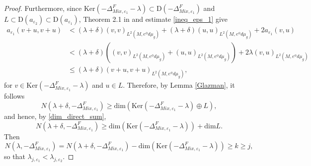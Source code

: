 \documentclass[12pt,a4paper]{amsart}
\numberwithin{equation}{section}
\theoremstyle{plain}
\theoremstyle{definition}
\begin{document}
\begin{proof}
	Furthermore, since $\mathrm{Ker}\left(-\Delta_{Mix,\varepsilon_1}^F - \lambda\right) \subset \mathrm{D}(-\Delta_{Mix,\varepsilon_1}^F)$ and $L\subset  \mathrm{D}(a_{\varepsilon_2}) \subset \mathrm{D}(a_{\varepsilon_1}) $, Theorem 2.1 in \cite[Chapter 6]{Kato} and estimate \eqref{ineq_eps_1} give
	\begin{align*}
		a_{\varepsilon_1}(v + u, v + u) &< (\lambda +\delta) (v,v)_{L^2(M,e^\phi d\mu_g)} + (\lambda +\delta) (u,u)_{L^2(M,e^\phi d\mu_g)} + 2 a_{\varepsilon_1}(v , u)\\
		&< (\lambda +\delta) \left((v,v)_{L^2(M,e^\phi d\mu_g)} + (u,u)_{L^2(M,e^\phi d\mu_g)} \right) + 2\lambda (v,u)_{L^2(M,e^\phi d\mu_g)}\\
		& \leq (\lambda +\delta) (v + u, v + u)_{L^2(M,e^\phi d\mu_g)},
	\end{align*}
	for $v \in \mathrm{Ker}\left(-\Delta_{Mix,\varepsilon_1}^F - \lambda\right)$ and $u\in L$. Therefore, by Lemma \ref{Glazman}, it follows 
	\begin{equation*}
		N\left(\lambda+\delta, -\Delta_{Mix,\varepsilon_1}^F\right) \geq \mathrm{dim} \left(\mathrm{Ker}\left(-\Delta_{Mix,\varepsilon_1}^F - \lambda\right) \oplus L \right), 
	\end{equation*}
	and hence, by \eqref{dim_direct_sum},
	\begin{equation*}
		N\left(\lambda+\delta, -\Delta_{Mix,\varepsilon_1}^F\right) \geq \mathrm{dim} \left(\mathrm{Ker}\left(-\Delta_{Mix,\varepsilon_1}^F - \lambda\right)\right) + \mathrm{dim} L.
	\end{equation*}
	Then
	\begin{equation*}
		N\left(\lambda, -\Delta_{Mix,\varepsilon_1}^F\right) = N\left(\lambda+\delta, -\Delta_{Mix,\varepsilon_1}^F\right) - \mathrm{dim} \left(\mathrm{Ker}\left(-\Delta_{Mix,\varepsilon_1}^F - \lambda\right)\right) \geq k \geq j,
	\end{equation*}
	so that $\lambda_{j,\varepsilon_1} < \lambda_{j,\varepsilon_2}$.
\end{proof}
\end{document}
